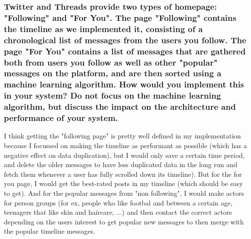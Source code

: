 \documentclass[a4paper]{article}
\begin{document}
\subsubsection{Twitter and Threads provide two types of homepage: "Following" and "For You". The page "Following" contains the timeline as we implemented it, consisting of a chronological list of messages from the users you follow. The page "For You" contains a list of messages that are gathered both from users you follow as well as other "popular" messages on the platform,
and are then sorted using a machine learning algorithm. How would you implement this in
your system? Do not focus on the machine learning algorithm, but discuss the impact on the
architecture and performance of your system.} 
I think getting the "following page" is pretty well defined in my implementation because I focussed on making the timeline as performant as possible (which has a negative effect on data duplication), but I would only save a certain time period, and delete the older messages to have less duplicated data in the long run and fetch them whenever a user has fully scrolled down its timeline). But for the for you page, I would get the best-rated posts in my timeline (which should be easy to get). And for the popular messages from "non following", I would make actors for person groups (for ex, people who like footbal and between a certain age, teenagers that like skin and haircare, ...) and then contact the correct actors depending on the users interest to get popular new messages to then merge with the popular timeline messages. 


%
\end{document}
